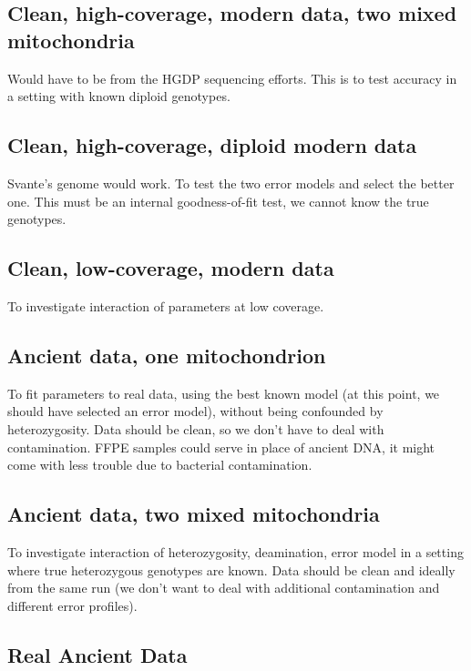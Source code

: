 \documentclass{article}
\begin{document}
\subsection{Clean, high-coverage, modern data, two mixed mitochondria}

Would have to be from the HGDP sequencing efforts.  This is to test
accuracy in a setting with known diploid genotypes.

\subsection{Clean, high-coverage, diploid modern data}

Svante's genome would work.  To test the two error models and select the
better one.  This must be an internal goodness-of-fit test, we cannot
know the true genotypes.

\subsection{Clean, low-coverage, modern data}

To investigate interaction of parameters at low coverage.

\subsection{Ancient data, one mitochondrion}

To fit parameters to real data, using the best known model (at this
point, we should have selected an error model), without being confounded
by heterozygosity.  Data should be clean, so we don't have to deal with
contamination.  FFPE samples could serve in place of ancient DNA, it
might come with less trouble due to bacterial contamination.

\subsection{Ancient data, two mixed mitochondria}

To investigate interaction of heterozygosity, deamination, error model
in a setting where true heterozygous genotypes are known.  Data should
be clean and ideally from the same run (we don't want to deal with
additional contamination and different error profiles).

\subsection{Real Ancient Data}
\end{document}
